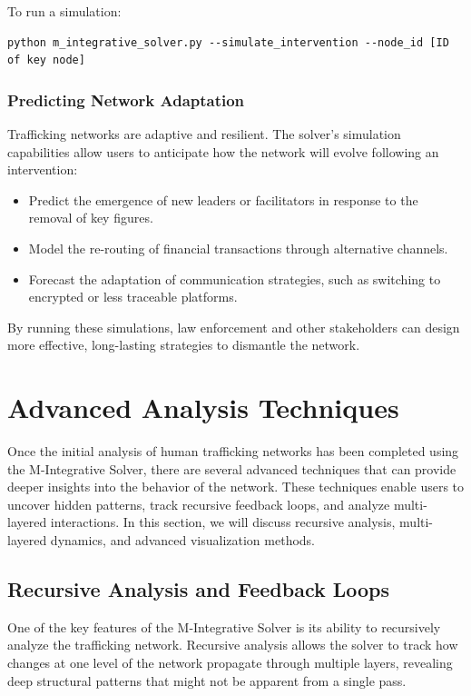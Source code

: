 \documentclass[%
 preprint, linenumbers,
 amsmath,amssymb,
 aps, physrev,
]{revtex4-2}
\begin{document}
To run a simulation:
\begin{verbatim}
python m_integrative_solver.py --simulate_intervention --node_id [ID of key node]
\end{verbatim}

\subsubsection{Predicting Network Adaptation}

Trafficking networks are adaptive and resilient. The solver’s simulation capabilities allow users to anticipate how the network will evolve following an intervention:
\begin{itemize}
    \item Predict the emergence of new leaders or facilitators in response to the removal of key figures.
    \item Model the re-routing of financial transactions through alternative channels.
    \item Forecast the adaptation of communication strategies, such as switching to encrypted or less traceable platforms.
\end{itemize}

By running these simulations, law enforcement and other stakeholders can design more effective, long-lasting strategies to dismantle the network.

\section{Advanced Analysis Techniques}

Once the initial analysis of human trafficking networks has been completed using the M-Integrative Solver, there are several advanced techniques that can provide deeper insights into the behavior of the network. These techniques enable users to uncover hidden patterns, track recursive feedback loops, and analyze multi-layered interactions. In this section, we will discuss recursive analysis, multi-layered dynamics, and advanced visualization methods.

\subsection{Recursive Analysis and Feedback Loops}

One of the key features of the M-Integrative Solver is its ability to recursively analyze the trafficking network. Recursive analysis allows the solver to track how changes at one level of the network propagate through multiple layers, revealing deep structural patterns that might not be apparent from a single pass.
\end{document}
